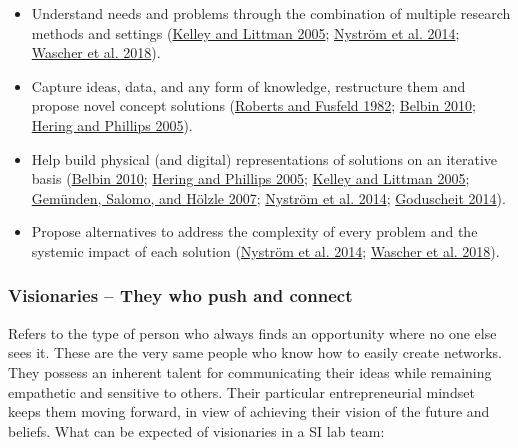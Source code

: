 \documentclass[AMA,STIX1COL,APA,STIX2COL]{WileyNJD-v2}
\providecommand{\tightlist}{%
  \setlength{\itemsep}{0pt}\setlength{\parskip}{0pt}}
\begin{document}
\begin{itemize}
\tightlist
\item
  Understand needs and problems through the combination of multiple
  research methods and settings
  (\protect\hyperlink{ref-Kelley2005}{Kelley and Littman 2005};
  \protect\hyperlink{ref-Nystrom2014}{Nyström et al. 2014};
  \protect\hyperlink{ref-Wascher2018}{Wascher et al. 2018}).
\item
  Capture ideas, data, and any form of knowledge, restructure them and
  propose novel concept solutions
  (\protect\hyperlink{ref-Roberts1982}{Roberts and Fusfeld 1982};
  \protect\hyperlink{ref-Belbin2010}{Belbin 2010};
  \protect\hyperlink{ref-Hering2005}{Hering and Phillips 2005}).
\item
  Help build physical (and digital) representations of solutions on an
  iterative basis (\protect\hyperlink{ref-Belbin2010}{Belbin 2010};
  \protect\hyperlink{ref-Hering2005}{Hering and Phillips 2005};
  \protect\hyperlink{ref-Kelley2005}{Kelley and Littman 2005};
  \protect\hyperlink{ref-Gemunden2007}{Gemünden, Salomo, and Hölzle
  2007}; \protect\hyperlink{ref-Nystrom2014}{Nyström et al. 2014};
  \protect\hyperlink{ref-Goduscheit2014}{Goduscheit 2014}).
\item
  Propose alternatives to address the complexity of every problem and
  the systemic impact of each solution
  (\protect\hyperlink{ref-Nystrom2014}{Nyström et al. 2014};
  \protect\hyperlink{ref-Wascher2018}{Wascher et al. 2018}).
\end{itemize}

\hypertarget{visionaries-they-who-push-and-connect}{%
\subsubsection{Visionaries -- They who push and
connect}\label{visionaries-they-who-push-and-connect}}

Refers to the type of person who always finds an opportunity where no
one else sees it. These are the very same people who know how to easily
create networks. They possess an inherent talent for communicating their
ideas while remaining empathetic and sensitive to others. Their
particular entrepreneurial mindset keeps them moving forward, in view of
achieving their vision of the future and beliefs. What can be expected
of visionaries in a SI lab team:
\end{document}
